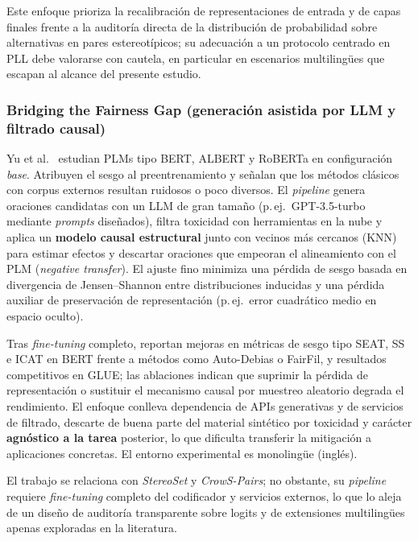 \documentclass[12pt,a4paper]{report}
\begin{document}
Este enfoque prioriza la recalibración de representaciones de entrada y de capas finales frente a la auditoría directa de la distribución de probabilidad sobre alternativas en pares estereotípicos; su adecuación a un protocolo centrado en PLL debe valorarse con cautela, en particular en escenarios multilingües que escapan al alcance del presente estudio.

\subsubsection{Bridging the Fairness Gap (generación asistida por LLM y filtrado causal)}

Yu et al.\ \cite{yu_bridging_2025} estudian PLMs tipo BERT, ALBERT y RoBERTa en configuración \textit{base}. Atribuyen el sesgo al preentrenamiento y señalan que los métodos clásicos con corpus externos resultan ruidosos o poco diversos. El \textit{pipeline} genera oraciones candidatas con un LLM de gran tamaño (p.\,ej.\ GPT-3.5-turbo mediante \textit{prompts} diseñados), filtra toxicidad con herramientas en la nube y aplica un \textbf{modelo causal estructural} junto con vecinos más cercanos (KNN) para estimar efectos y descartar oraciones que empeoran el alineamiento con el PLM (\textit{negative transfer}). El ajuste fino minimiza una pérdida de sesgo basada en divergencia de Jensen--Shannon entre distribuciones inducidas y una pérdida auxiliar de preservación de representación (p.\,ej.\ error cuadrático medio en espacio oculto).

Tras \textit{fine-tuning} completo, reportan mejoras en métricas de sesgo tipo SEAT, SS e ICAT en BERT frente a métodos como Auto-Debias o FairFil, y resultados competitivos en GLUE; las ablaciones indican que suprimir la pérdida de representación o sustituir el mecanismo causal por muestreo aleatorio degrada el rendimiento. El enfoque conlleva dependencia de APIs generativas y de servicios de filtrado, descarte de buena parte del material sintético por toxicidad y carácter \textbf{agnóstico a la tarea} posterior, lo que dificulta transferir la mitigación a aplicaciones concretas. El entorno experimental es monolingüe (inglés).

El trabajo se relaciona con \textit{StereoSet} y \textit{CrowS-Pairs}; no obstante, su \textit{pipeline} requiere \textit{fine-tuning} completo del codificador y servicios externos, lo que lo aleja de un diseño de auditoría transparente sobre logits y de extensiones multilingües apenas exploradas en la literatura.
\end{document}
